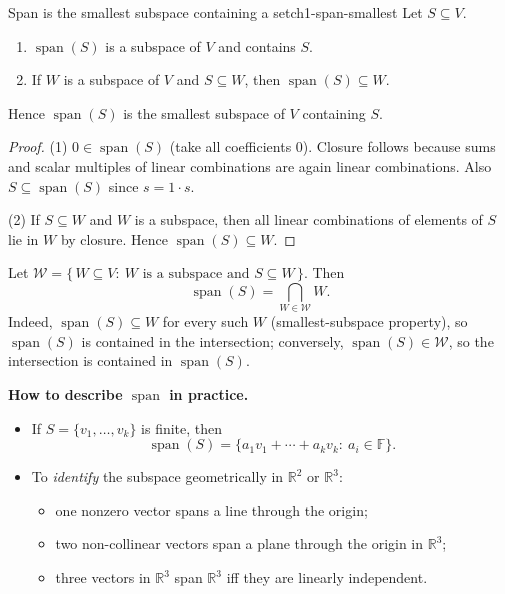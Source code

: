 \begin{theorem}{Span is the smallest subspace containing a set}{ch1-span-smallest}
Let $S\subseteq V$.
\begin{enumerate}
\item $\operatorname{span}(S)$ is a subspace of $V$ and contains $S$.
\item If $W$ is a subspace of $V$ and $S\subseteq W$, then $\operatorname{span}(S)\subseteq W$.
\end{enumerate}
Hence $\operatorname{span}(S)$ is the smallest subspace of $V$ containing $S$.
\begin{proof}
(1) $0\in\operatorname{span}(S)$ (take all coefficients $0$). Closure follows because sums and scalar multiples of linear combinations are again linear combinations. Also $S\subseteq\operatorname{span}(S)$ since $s=1\cdot s$.

(2) If $S\subseteq W$ and $W$ is a subspace, then all linear combinations of elements of $S$ lie in $W$ by closure. Hence $\operatorname{span}(S)\subseteq W$.
\end{proof}
\end{theorem}

\begin{policynote}[title={Extension (Lecture Week 2: Span as an intersection)}]
Let $\mathcal{W}=\{\,W\subseteq V:\ W\text{ is a subspace and }S\subseteq W\,\}$.
Then
\[
\operatorname{span}(S)=\bigcap_{W\in\mathcal{W}} W.
\]
Indeed, $\operatorname{span}(S)\subseteq W$ for every such $W$ (smallest-subspace property), so $\operatorname{span}(S)$ is contained in the intersection; conversely, $\operatorname{span}(S)\in\mathcal{W}$, so the intersection is contained in $\operatorname{span}(S)$.
\end{policynote}

\begin{keyformula}
\textbf{How to describe $\operatorname{span}$ in practice.}
\begin{itemize}
\item If $S=\{v_1,\ldots,v_k\}$ is finite, then
\[
\operatorname{span}(S)=\{a_1v_1+\cdots+a_kv_k:\ a_i\in\mathbb{F}\}.
\]
\item To \emph{identify} the subspace geometrically in $\mathbb{R}^2$ or $\mathbb{R}^3$:
\begin{itemize}
\item one nonzero vector spans a line through the origin;
\item two non-collinear vectors span a plane through the origin in $\mathbb{R}^3$;
\item three vectors in $\mathbb{R}^3$ span $\mathbb{R}^3$ iff they are linearly independent.
\end{itemize}
\end{itemize}
\end{keyformula}

